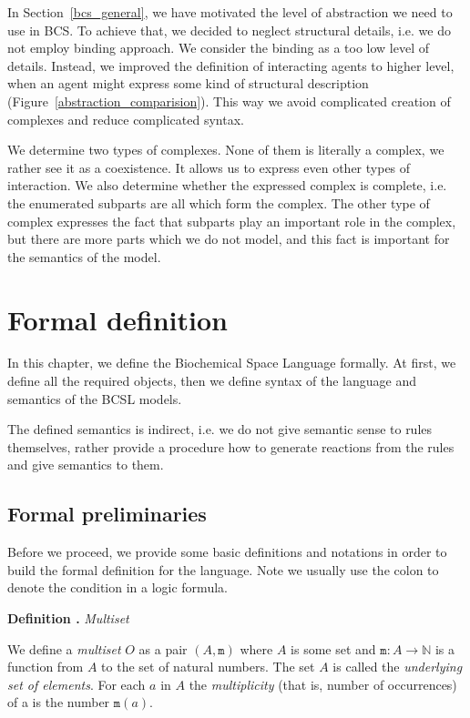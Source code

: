 \documentclass[12pt, twoside]{fithesis2} %
\newcounter{counter}[section]
\renewcommand{\thecounter}{\thesection.\arabic{counter}}
\newenvironment{definition}[1]{\bigskip\refstepcounter{counter}\noindent\textbf{Definition \thecounter } \emph{#1} \par\nopagebreak \begin{itshape}}{\end{itshape}\bigskip}
\begin{document}
In Section~\ref{bcs_general}, we have motivated the level of abstraction we need to use in BCS. To achieve that, we decided to neglect structural details, i.e. we do not employ binding approach. We consider the binding as a too low level of details. Instead, we improved the definition of interacting agents to higher level, when an agent might express some kind of structural description (Figure~\ref{abstraction_comparision}). This way we avoid complicated creation of complexes and reduce complicated syntax.

We determine two types of complexes. None of them is literally a complex, we rather see it as a coexistence. It allows us to express even other types of interaction. We also determine whether the expressed complex is complete, i.e. the enumerated subparts are all which form the complex. The other type of complex expresses the fact that subparts play an important role in the complex, but there are more parts which we do not model, and this fact is important for the semantics of the model.

\chapter{Formal definition}
\label{formal_definition}

In this chapter, we define the Biochemical Space Language formally. At first, we define all the required objects, then we define syntax of the language and semantics of the BCSL models.

The defined semantics is indirect, i.e. we do not give semantic sense to rules themselves, rather provide a procedure how to generate reactions from the rules and give semantics to them.

\section{Formal preliminaries}

Before we proceed, we provide some basic definitions and notations in order to build the formal definition for the language. Note we usually use the colon to denote the condition in a logic formula.

\begin{definition}{Multiset}
We define a \emph{multiset} $O$ as a pair $(A, \mathtt{m})$ where $A$ is some set and $ \mathtt{m} : A \rightarrow \mathbb{N} $ is a function from $A$ to the set of natural numbers. The set $A$ is called the \emph{underlying set of elements}. For each $a$ in $A$ the \emph{multiplicity} (that is, number of occurrences) of a is the number $\mathtt{m}(a)$.
\end{definition}
\end{document}
